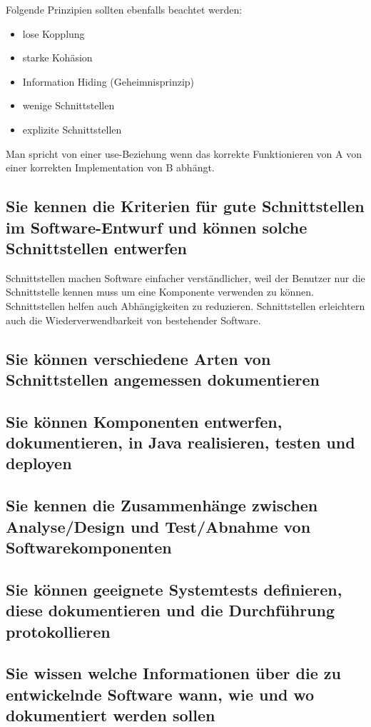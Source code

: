 Folgende Prinzipien sollten ebenfalls beachtet werden:

\begin{itemize}
	\item lose Kopplung
	\item starke Kohäsion
	\item Information Hiding (Geheimnisprinzip)
	\item wenige Schnittstellen
	\item explizite Schnittstellen
\end{itemize}

Man spricht von einer use-Beziehung wenn das korrekte Funktionieren von A von einer korrekten Implementation von B abhängt.

\subsection{Sie kennen die Kriterien für gute Schnittstellen im Software-Entwurf und können solche Schnittstellen entwerfen}

Schnittstellen machen Software einfacher verständlicher, weil der Benutzer nur die Schnittstelle kennen muss um eine Komponente verwenden zu können. Schnittstellen helfen auch Abhängigkeiten zu reduzieren. Schnittstellen erleichtern auch die Wiederverwendbarkeit von bestehender Software.

\subsection{Sie können verschiedene Arten von Schnittstellen angemessen dokumentieren}
\subsection{Sie können Komponenten entwerfen, dokumentieren, in Java realisieren, testen und deployen}
\subsection{Sie kennen die Zusammenhänge zwischen Analyse/Design und Test/Abnahme von Softwarekomponenten}
\subsection{Sie können geeignete Systemtests definieren, diese dokumentieren und die Durchführung protokollieren}
\subsection{Sie wissen welche Informationen über die zu entwickelnde Software wann, wie und wo dokumentiert werden sollen}
